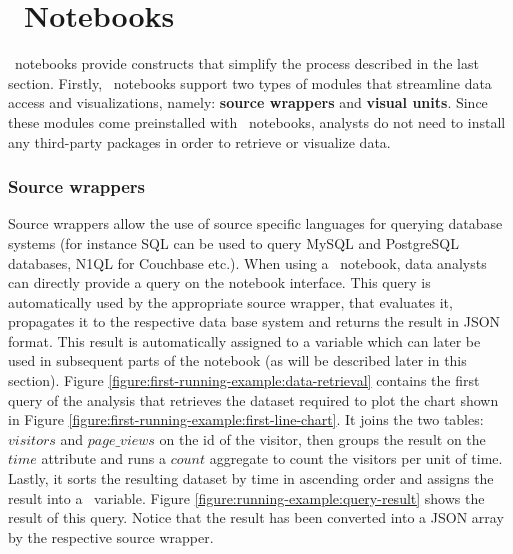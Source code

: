 
\section{\projname\ Notebooks}

\projname\ notebooks provide constructs that simplify the process described in the last section. Firstly, \projname\ notebooks support two types of modules that streamline data access and visualizations, namely: \textbf{source wrappers} and \textbf{visual units}. Since these modules come preinstalled with \projname\ notebooks, analysts do not need to install any third-party packages in order to retrieve or visualize data.




\subsubsection*{Source wrappers}

Source wrappers allow the use of source specific languages for querying database systems (for instance SQL can be used to query MySQL and PostgreSQL databases, N1QL for Couchbase etc.). When using a \projname\ notebook, data analysts can directly provide a query on the notebook interface. This query is automatically used by the appropriate source wrapper, that evaluates it, propagates it to the respective data base system and returns the result in JSON format. This result is automatically assigned to a variable which can later be used in subsequent parts of the notebook (as will be described later in this section). Figure \ref{figure:first-running-example:data-retrieval} contains the first query of the analysis that retrieves the dataset required to plot the chart shown in Figure \ref{figure:first-running-example:first-line-chart}. It joins the two tables: $visitors$ and $page\_views$ on the id of the visitor, then groups the result on the $time$ attribute and runs a $count$ aggregate to count the visitors per unit of time. Lastly, it sorts the resulting dataset by time in ascending order and assigns the result into a \projname\ variable. Figure \ref{figure:running-example:query-result} shows the result of this query. Notice that the result has been converted into a JSON array by the respective source wrapper. 

